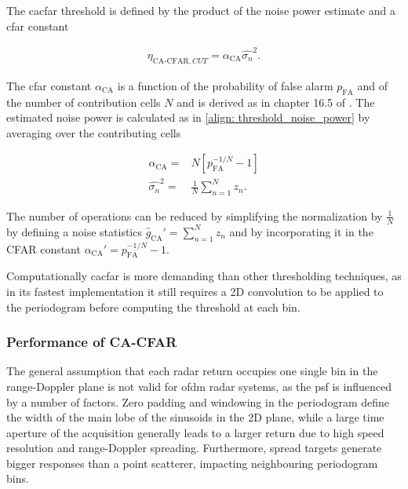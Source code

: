 
The \gls{cacfar} threshold is defined by the product of the noise power estimate and a \gls{cfar} constant

\begin{align*}
	\eta_{\text{CA-CFAR},CUT} = \alpha_{\text{CA}} \hat{\sigma_n}^2.
\end{align*}

The \gls{cfar} constant $\alpha_{\text{CA}}$ is a function of the probability of false alarm $p_{\text{FA}}$ and of the number of contribution cells $N$ and is derived as in chapter 16.5 of \cite{Richards_Scheer_Holm_2010}. The estimated noise power is calculated as in \ref{align: threshold_noise_power} by averaging over the contributing cells

\begin{align*}
	\alpha_{\text{CA}} =& N[p_{\text{FA}}^{-1/N} - 1] \\
	\hat{\sigma_n}^2 =& \frac{1}{N}\sum_{n=1}^N z_n.
\end{align*}

The number of operations can be reduced by simplifying the normalization by $\frac{1}{N}$ by defining a noise statistics $\hat{g}_{\text{CA}}' = \sum_{n=1}^N z_n$ and by incorporating it in the CFAR constant $\alpha_{\text{CA}}' = p_{\text{FA}}^{-1/N} - 1$.

Computationally \gls{cacfar} is more demanding than other thresholding techniques, as in its fastest implementation it still requires a 2D convolution to be applied to the periodogram before computing the threshold at each bin.

\subsubsection{Performance of CA-CFAR}

The general assumption that each radar return occupies one single bin in the range-Doppler plane is not valid for \gls{ofdm} radar systems, as the \gls{psf} is influenced by a number of factors.
Zero padding and windowing in the periodogram define the width of the main lobe of the sinusoids in the 2D plane, while a large time aperture of the acquisition generally leads to a larger return due to high speed resolution and range-Doppler spreading.
Furthermore, spread targets generate bigger responses than a point scatterer, impacting neighbouring periodogram bins.

